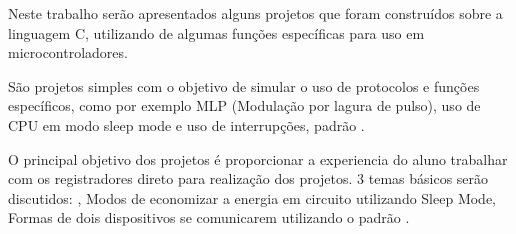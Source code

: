\newcommand{\comando}[1]{\textbf{$\backslash$#1}}


Neste trabalho serão apresentados alguns projetos que foram construídos sobre a linguagem C, utilizando de algumas funções específicas para uso em microcontroladores.

São projetos simples com o objetivo de simular o uso de protocolos e funções específicos, como por exemplo MLP (Modulação por lagura de pulso), uso de CPU em modo sleep mode e uso de interrupções, padrão .

O principal objetivo dos projetos é proporcionar a experiencia do aluno
trabalhar com os registradores direto para realização dos projetos. 3 temas básicos serão discutidos: , Modos de economizar a energia em circuito utilizando Sleep Mode, Formas de dois dispositivos se comunicarem utilizando o padrão .


